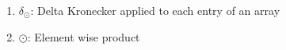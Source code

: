 \begin{enumerate}
    \item $\delta_{\odot}$: Delta Kronecker applied to each entry of an array
    \item $\odot$: Element wise product
\end{enumerate}

